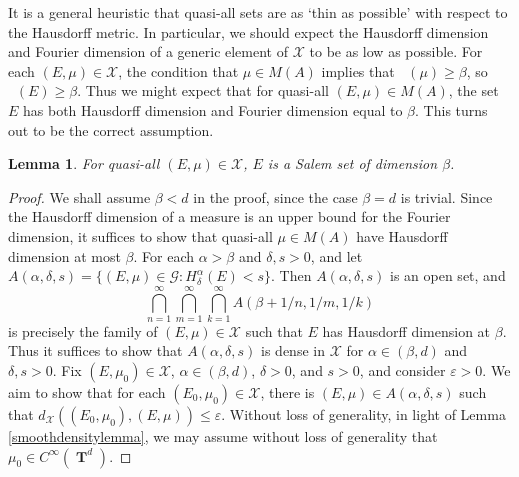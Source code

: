 \documentclass[12pt,reqno]{article}
\numberwithin{equation}{section}
\DeclareMathOperator{\hausdim}{\dim_{\mathbf{H}}}
\DeclareMathOperator{\fordim}{\dim_{\mathbf{F}}}
\DeclareMathOperator{\TT}{\mathbf{T}}
\newtheorem{lemma}[theorem]{Lemma}
\begin{document}
It is a general heuristic that quasi-all sets are as `thin as possible' with respect to the Hausdorff metric. In particular, we should expect the Hausdorff dimension and Fourier dimension of a generic element of $\mathcal{X}$ to be as low as possible. For each $(E,\mu) \in \mathcal{X}$, the condition that $\mu \in M(A)$ implies that $\fordim(\mu) \geq \beta$, so $\fordim(E) \geq \beta$. Thus we might expect that for quasi-all $(E,\mu) \in M(A)$, the set $E$ has both Hausdorff dimension and Fourier dimension equal to $\beta$. This turns out to be the correct assumption.

\begin{lemma}
    For quasi-all $(E,\mu) \in \mathcal{X}$, $E$ is a Salem set of dimension $\beta$.
\end{lemma}
\begin{proof}
    We shall assume $\beta < d$ in the proof, since the case $\beta = d$ is trivial. Since the Hausdorff dimension of a measure is an upper bound for the Fourier dimension, it suffices to show that quasi-all $\mu \in M(A)$ have Hausdorff dimension at most $\beta$. For each $\alpha > \beta$ and $\delta, s > 0$, and let $A(\alpha,\delta,s) = \{ (E,\mu) \in \mathcal{G}: H^\alpha_\delta(E) < s \}$. Then $A(\alpha,\delta,s)$ is an open set, and
    \[ \bigcap_{n = 1}^\infty \bigcap_{m = 1}^\infty \bigcap_{k = 1}^\infty A(\beta + 1/n, 1/m, 1/k) \]
    is precisely the family of $(E,\mu) \in \mathcal{X}$ such that $E$ has Hausdorff dimension at $\beta$.
%
    Thus it suffices to show that $A(\alpha,\delta,s)$ is dense in $\mathcal{X}$ for $\alpha \in (\beta,d)$ and $\delta, s > 0$. Fix $(E,\mu_0) \in \mathcal{X}$, $\alpha \in (\beta,d)$, $\delta > 0$, and $s > 0$, and consider $\varepsilon > 0$. We aim to show that for each $(E_0,\mu_0) \in \mathcal{X}$, there is $(E,\mu) \in A(\alpha,\delta,s)$ such that $d_{\mathcal{X}}((E_0,\mu_0),(E,\mu)) \leq \varepsilon$. Without loss of generality, in light of Lemma \ref{smoothdensitylemma}, we may assume without loss of generality that $\mu_0 \in C^\infty(\TT^d)$.


\end{proof}
\end{document}
